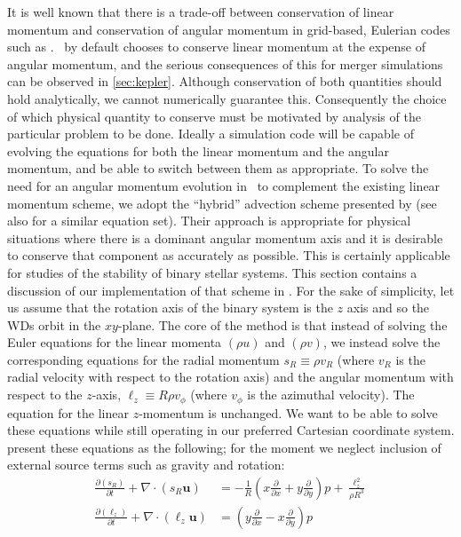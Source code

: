 \documentclass[12pt]{article}
\begin{document}
It is well known that there is a trade-off between conservation of linear
momentum and conservation of angular momentum in grid-based, Eulerian codes
such as \castro. \castro\ by default chooses to conserve linear momentum
at the expense of angular momentum, and the serious consequences of this for
merger simulations can be observed in \autoref{sec:kepler}. Although conservation
of both quantities should hold analytically, we cannot numerically guarantee this.
Consequently the choice of which physical quantity to conserve must be motivated
by analysis of the particular problem to be done. Ideally a simulation code will
be capable of evolving the equations for both the linear momentum and the angular
momentum, and be able to switch between them as appropriate.
To solve the need for an angular momentum evolution in \castro\ to complement the
existing linear momentum scheme, we adopt the ``hybrid''
advection scheme presented by \cite{byerly:2014} (see also \cite{motl:2002} for
a similar equation set). Their approach is appropriate for physical situations
where there is a dominant angular momentum axis and it is desirable to conserve
that component as accurately as possible. This is certainly applicable for
studies of the stability of binary stellar systems. This section contains a
discussion of our implementation of that scheme in \castro. For the sake
of simplicity, let us assume that the rotation axis of the binary system is the $z$
axis and so the WDs orbit in the $xy$-plane. The core of the method is that instead
of solving the Euler equations for the linear momenta $(\rho u)$ and $(\rho v)$,
we instead solve the corresponding equations for the radial momentum
$s_R \equiv \rho v_R$ (where $v_R$ is the radial velocity with respect to the
rotation axis) and the angular momentum with respect to the $z$-axis,
$\ell_z \equiv R\rho v_\phi$ (where $v_\phi$ is the azimuthal velocity).
The equation for the linear $z$-momentum is unchanged. We want to be able
to solve these equations while still operating in our preferred Cartesian
coordinate system. \cite{byerly:2014} present these equations as the following;
for the moment we neglect inclusion of external source terms such as gravity and rotation:
\begin{align}
  \frac{\partial(s_R)}{\partial t} + \nabla \cdot (s_R \mathbf{u}) &=
    - \frac{1}{R}\left(x \frac{\partial}{\partial x} + y \frac{\partial}{\partial y}\right) p
    + \frac{\ell_z^2}{\rho R^3} \label{eq:radial-momentum}\\
    \frac{\partial(\ell_z)}{\partial t} + \nabla \cdot (\ell_z \mathbf{u}) &=
  \left(y\frac{\partial}{\partial x} - x \frac{\partial}{\partial y}\right) p \label{eq:angular-momentum}
\end{align}
\end{document}
